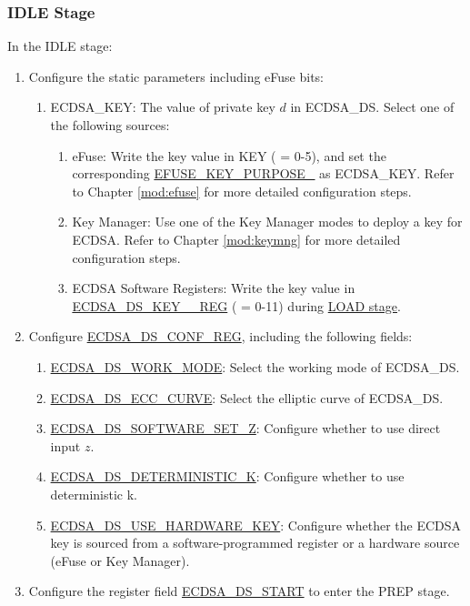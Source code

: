 \documentclass[main\_\_EN.tex]{subfiles}
\begin{document}
\subsubsection{IDLE Stage}
In the IDLE stage:
\begin{enumerate}
	\item Configure the static parameters including eFuse bits:
	      \begin{enumerate}
		      \item ECDSA\_KEY: The value of private key $d$ in ECDSA\_DS. Select one of the following sources:
                \begin{enumerate}
                    \item eFuse: Write the key value in KEY ( = 0-5), and set the corresponding \hyperref[regdesc:EFUSEKEYPURPOSE0]{EFUSE\_KEY\_PURPOSE\_} as ECDSA\_KEY. Refer to Chapter \ref{mod:efuse} \textit{} for more detailed configuration steps.
                    \item Key Manager: Use one of the Key Manager modes to deploy a key for ECDSA. Refer to Chapter \ref{mod:keymng} \textit{} for more detailed configuration steps.
                    \item ECDSA Software Registers: Write the key value in \hyperref[regdesc:ECDSADSKEY0REG]{ECDSA\_DS\_KEY\_\_REG} ( = 0-11) during \hyperref[sec:ecdsa-software-key-load-stage]{LOAD stage}. 
               \end{enumerate}
	      \end{enumerate}
	\item Configure \hyperref[regdesc:ECDSADSCONFREG]{ECDSA\_DS\_CONF\_REG}, including the following fields:
	      \begin{enumerate}
		      \item \hyperref[fielddesc:ECDSADSWORKMODE]{ECDSA\_DS\_WORK\_MODE}: Select the working mode of ECDSA\_DS.
		      \item \hyperref[fielddesc:ECDSADSECCCURVE]{ECDSA\_DS\_ECC\_CURVE}: Select the elliptic curve of ECDSA\_DS.
		      \item \hyperref[fielddesc:ECDSADSSOFTWARESETZ]{ECDSA\_DS\_SOFTWARE\_SET\_Z}: Configure whether to use direct input $z$.
		    \item \hyperref[fielddesc:ECDSADSDETERMINISTICK]{ECDSA\_DS\_DETERMINISTIC\_K}: Configure whether to use deterministic k.
                \item \hyperref[fielddesc:ECDSADSUSEHARDWAREKEY]{ECDSA\_DS\_USE\_HARDWARE\_KEY}: Configure whether the ECDSA key is sourced from a software-programmed register or a hardware source (eFuse or Key Manager).
	      \end{enumerate}
	\item Configure the register field \hyperref[fielddesc:ECDSADSSTART]{ECDSA\_DS\_START} to enter the PREP stage.
\end{enumerate}
\end{document}
